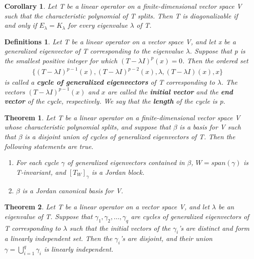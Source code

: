\documentclass{article}
\newcommand{\bd}[1]{\textbf{#1}}
\newcommand{\enumalph}[0]{\begin{enumerate}[label=(\alph*)]}
\theoremstyle{plain}
\newtheorem{theorem}{Theorem}[section]
\newtheorem*{corollary}{Corollary}
\newtheorem*{definitions}{Definitions}
\theoremstyle{plain} %
\begin{document}
\begin{corollary}
  Let T be a linear operator on a finite-dimensional vector space V such that the characteristic polynomial of T splits. Then T is diagonalizable if and only if $E_\lambda = K_\lambda$ for every eigenvalue $\lambda$ of T.
\end{corollary}

\begin{definitions}
  Let T be a linear operator on a vector space V, and let x be a generalized eigenvector of T corresponding to the eigenvalue $\lambda$. Suppose that p is the smallest positive integer for which $(T − \lambda I)^p(x) = 0$. Then the ordered set
  \begin{align*}
    \{(T − \lambda I)^{p−1}(x), (T − \lambda I)^{p−2}(x), \lambda , (T − \lambda I)(x), x\}
  \end{align*}
  is called a \bd{cycle of generalized eigenvectors} of T corresponding to $\lambda$. The vectors $(T − \lambda I)^{p−1}(x)$ and $x$ are called the \bd{initial vector} and the \bd{end vector} of the cycle, respectively. We say that the \bd{length} of the cycle is p.
\end{definitions}

\begin{theorem}
  Let T be a linear operator on a finite-dimensional vector space V whose characteristic polynomial splits, and suppose that $\beta$ is a basis for V such that $\beta$ is a disjoint union of cycles of generalized eigenvectors of T. Then the following statements are true.
  \enumalph
    \item For each cycle $\gamma$ of generalized eigenvectors contained in $\beta$, $W = span(\gamma)$ is T-invariant, and $[T_W]_\gamma$ is a Jordan block.
    \item $\beta$ is a Jordan canonical basis for V.
  \end{enumerate}
\end{theorem}

\begin{theorem}
  Let T be a linear operator on a vector space V, and let $\lambda$ be an eigenvalue of T. Suppose that $\gamma_1, \gamma_2, \ldots , \gamma_q$ are cycles of generalized eigenvectors of T corresponding to $\lambda$ such that the initial vectors of the $\gamma_i$’s are distinct and form a linearly independent set. Then the $\gamma_i$’s are disjoint, and their union $\gamma =\bigcup_{i=1}^q \gamma_i$ is linearly independent.
\end{theorem}
\end{document}
